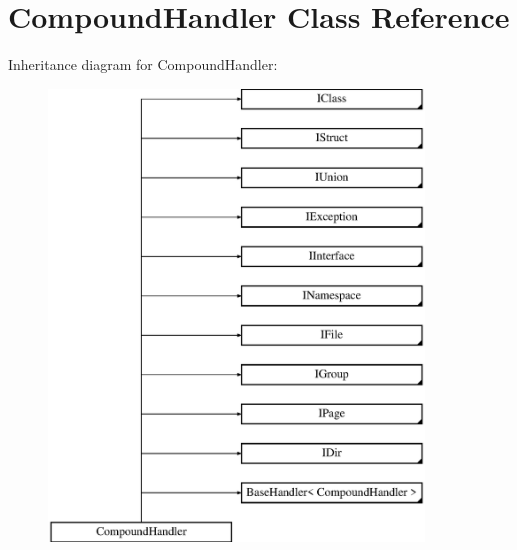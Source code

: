 \hypertarget{class_compound_handler}{}\section{Compound\+Handler Class Reference}
\label{class_compound_handler}
Inheritance diagram for Compound\+Handler\+:\begin{figure}[H]
\begin{center}
\leavevmode
\includegraphics[height=12.000000cm]{class_compound_handler}
\end{center}
\end{figure}
